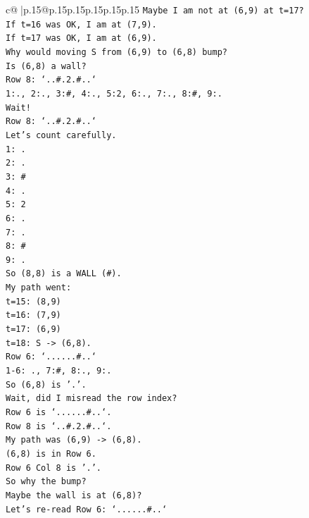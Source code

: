\documentclass{article}
\begin{document}
{\begin{supertabular}{c@{$\;$}|p{.15\linewidth}@{}p{.15\linewidth}p{.15\linewidth}p{.15\linewidth}p{.15\linewidth}p{.15\linewidth}}
{{{\texttt{Maybe I am not at (6,9) at t=17?} \\
\texttt{If t=16 was OK, I am at (7,9).} \\
\texttt{If t=17 was OK, I am at (6,9).} \\
\texttt{Why would moving S from (6,9) to (6,8) bump?} \\
\texttt{Is (6,8) a wall?} \\
\texttt{Row 8: `..\#.2.\#..`} \\
\texttt{1:., 2:., 3:\#, 4:., 5:2, 6:., 7:., 8:\#, 9:.} \\
\texttt{Wait!} \\
\texttt{Row 8: `..\#.2.\#..`} \\
\texttt{Let's count carefully.} \\
\texttt{1: .} \\
\texttt{2: .} \\
\texttt{3: \#} \\
\texttt{4: .} \\
\texttt{5: 2} \\
\texttt{6: .} \\
\texttt{7: .} \\
\texttt{8: \#} \\
\texttt{9: .} \\
\texttt{So (8,8) is a WALL (\#).} \\
\texttt{My path went:} \\
\texttt{t=15: (8,9)} \\
\texttt{t=16: (7,9)} \\
\texttt{t=17: (6,9)} \\
\texttt{t=18: S {-}> (6,8).} \\
\texttt{Row 6: `......\#..`} \\
\texttt{1{-}6: ., 7:\#, 8:., 9:.} \\
\texttt{So (6,8) is '.'.} \\
\texttt{Wait, did I misread the row index?} \\
\texttt{Row 6 is `......\#..`.} \\
\texttt{Row 8 is `..\#.2.\#..`.} \\
\texttt{My path was (6,9) {-}> (6,8).} \\
\texttt{(6,8) is in Row 6.} \\
\texttt{Row 6 Col 8 is '.'.} \\
\texttt{So why the bump?} \\
\texttt{Maybe the wall is at (6,8)?} \\
\texttt{Let's re{-}read Row 6: `......\#..`} \\
}}}
\end{supertabular}}
\end{document}
